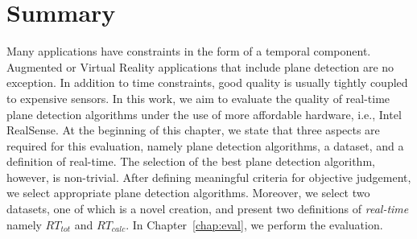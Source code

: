 \documentclass[main.tex]{subfiles}
\begin{document}
\section{Summary}
Many applications have constraints in the form of a temporal component. Augmented or Virtual Reality applications that include plane detection
are no exception. In addition to time constraints, good quality is usually tightly coupled to expensive sensors.
In this work, we aim to evaluate the quality of real-time plane detection algorithms under the use of more affordable hardware, i.e., Intel RealSense.
At the beginning of this chapter, we state that three aspects are required for this evaluation, namely plane detection algorithms, a dataset, and a definition
of real-time.
The selection of the best plane detection algorithm, however, is non-trivial. After defining meaningful criteria for objective judgement, we
select appropriate plane detection algorithms. Moreover, we select two datasets, one of which is a novel creation,
and present two definitions of \textit{real-time} namely $RT_{tot}$ and $RT_{calc}$.
In Chapter~\ref{chap:eval}, we perform the evaluation.
\end{document}
